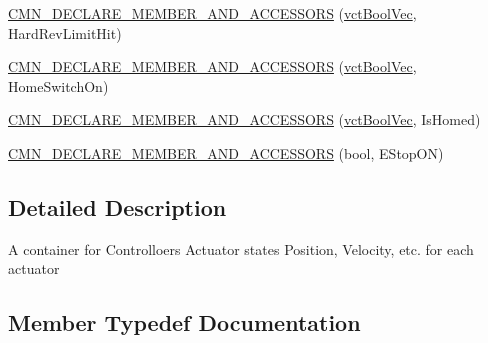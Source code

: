 {\bf }\par
\begin{DoxyCompactItemize}
\item 
\hyperlink{classprm_actuator_state_ab396299b1db637d900e1f53193e00683}{C\+M\+N\+\_\+\+D\+E\+C\+L\+A\+R\+E\+\_\+\+M\+E\+M\+B\+E\+R\+\_\+\+A\+N\+D\+\_\+\+A\+C\+C\+E\+S\+S\+O\+R\+S} (\hyperlink{vct_dynamic_vector_types_8h_aeb2237c134aee3769198bd9d55c8a9e0}{vct\+Bool\+Vec}, Hard\+Rev\+Limit\+Hit)
\end{DoxyCompactItemize}

{\bf }\par
\begin{DoxyCompactItemize}
\item 
\hyperlink{classprm_actuator_state_ab1d3a692904209cce8a864cb0b941d65}{C\+M\+N\+\_\+\+D\+E\+C\+L\+A\+R\+E\+\_\+\+M\+E\+M\+B\+E\+R\+\_\+\+A\+N\+D\+\_\+\+A\+C\+C\+E\+S\+S\+O\+R\+S} (\hyperlink{vct_dynamic_vector_types_8h_aeb2237c134aee3769198bd9d55c8a9e0}{vct\+Bool\+Vec}, Home\+Switch\+On)
\end{DoxyCompactItemize}

{\bf }\par
\begin{DoxyCompactItemize}
\item 
\hyperlink{classprm_actuator_state_a5526cdcc55fd6e7eea716dbda68c62ae}{C\+M\+N\+\_\+\+D\+E\+C\+L\+A\+R\+E\+\_\+\+M\+E\+M\+B\+E\+R\+\_\+\+A\+N\+D\+\_\+\+A\+C\+C\+E\+S\+S\+O\+R\+S} (\hyperlink{vct_dynamic_vector_types_8h_aeb2237c134aee3769198bd9d55c8a9e0}{vct\+Bool\+Vec}, Is\+Homed)
\end{DoxyCompactItemize}

{\bf }\par
\begin{DoxyCompactItemize}
\item 
\hyperlink{classprm_actuator_state_aa58234ef96820600c77675818235e424}{C\+M\+N\+\_\+\+D\+E\+C\+L\+A\+R\+E\+\_\+\+M\+E\+M\+B\+E\+R\+\_\+\+A\+N\+D\+\_\+\+A\+C\+C\+E\+S\+S\+O\+R\+S} (bool, E\+Stop\+O\+N)
\end{DoxyCompactItemize}



\subsection{Detailed Description}
A container for Controlloer\textquotesingle{}s Actuator states Position, Velocity, etc. for each actuator 

\subsection{Member Typedef Documentation}
\hypertarget{classprm_actuator_state_abdc6ad9216ba3ef6720153feeadee054}{}
